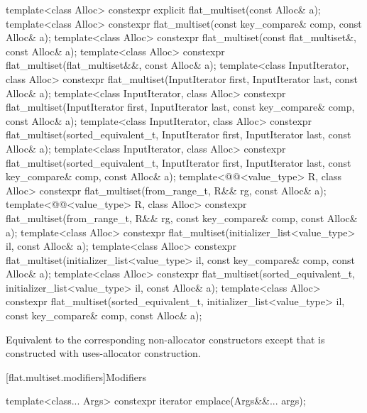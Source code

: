 %
\begin{itemdecl}
template<class Alloc>
  constexpr explicit flat_multiset(const Alloc& a);
template<class Alloc>
  constexpr flat_multiset(const key_compare& comp, const Alloc& a);
template<class Alloc>
  constexpr flat_multiset(const flat_multiset&, const Alloc& a);
template<class Alloc>
  constexpr flat_multiset(flat_multiset&&, const Alloc& a);
template<class InputIterator, class Alloc>
  constexpr flat_multiset(InputIterator first, InputIterator last, const Alloc& a);
template<class InputIterator, class Alloc>
  constexpr flat_multiset(InputIterator first, InputIterator last,
                          const key_compare& comp, const Alloc& a);
template<class InputIterator, class Alloc>
  constexpr flat_multiset(sorted_equivalent_t, InputIterator first, InputIterator last,
                          const Alloc& a);
template<class InputIterator, class Alloc>
  constexpr flat_multiset(sorted_equivalent_t, InputIterator first, InputIterator last,
                          const key_compare& comp, const Alloc& a);
template<@@<value_type> R, class Alloc>
  constexpr flat_multiset(from_range_t, R&& rg, const Alloc& a);
template<@@<value_type> R, class Alloc>
  constexpr flat_multiset(from_range_t, R&& rg, const key_compare& comp, const Alloc& a);
template<class Alloc>
  constexpr flat_multiset(initializer_list<value_type> il, const Alloc& a);
template<class Alloc>
  constexpr flat_multiset(initializer_list<value_type> il, const key_compare& comp,
                          const Alloc& a);
template<class Alloc>
  constexpr flat_multiset(sorted_equivalent_t, initializer_list<value_type> il, const Alloc& a);
template<class Alloc>
  constexpr flat_multiset(sorted_equivalent_t, initializer_list<value_type> il,
                          const key_compare& comp, const Alloc& a);
\end{itemdecl}

\begin{itemdescr}
\pnum
\effects
Equivalent to the corresponding non-allocator constructors
except that  is constructed with
uses-allocator construction.
\end{itemdescr}

[flat.multiset.modifiers]{Modifiers}

%
\begin{itemdecl}
template<class... Args> constexpr iterator emplace(Args&&... args);
\end{itemdecl}

